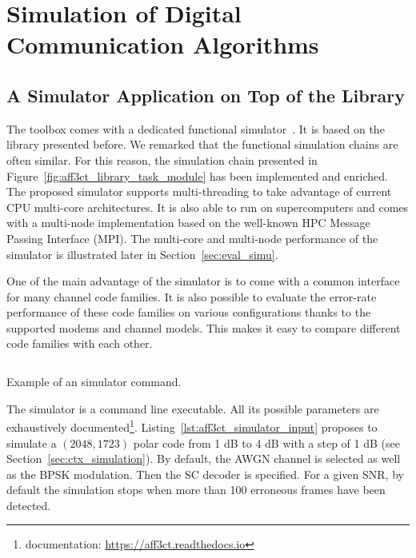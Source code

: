 \section{Simulation of Digital Communication Algorithms}

\subsection{A Simulator Application on Top of the Library}
\label{sec:aff3ct_simulator_example}

The \AFFECT toolbox comes with a dedicated functional
simulator~\cite{Cassagne2017}. It is based on the \AFFECT library presented
before. We remarked that the functional simulation chains are often similar. For
this reason, the simulation chain presented in
Figure~\ref{fig:aff3ct_library_task_module} has been implemented and enriched.
The proposed simulator supports multi-threading to take advantage of current CPU
multi-core architectures. It is also able to run on supercomputers and comes
with a multi-node implementation based on the well-known HPC Message Passing
Interface (MPI). The multi-core and multi-node performance of the \AFFECT
simulator is illustrated later in Section~\ref{sec:eval_simu}.

One of the main advantage of the \AFFECT simulator is to come with a common
interface for many channel code families. It is also possible to evaluate the
error-rate performance of these code families on various configurations thanks
to the supported modems and channel models. This makes it easy to compare
different code families with each other.

\begin{listing}[htp]
  \inputminted[frame=lines]{bash}{\curChapter/src/use_cases/simulator/input.txt}
  \caption{Example of an \AFFECT simulator command.}
  \label{lst:aff3ct_simulator_input}
\end{listing}

The \AFFECT simulator is a command line executable. All its possible parameters
are exhaustively documented\footnote{\AFFECT documentation:
\url{https://aff3ct.readthedocs.io}}. Listing~\ref{lst:aff3ct_simulator_input}
proposes to simulate a $(2048,1723)$ polar code from 1 dB to 4 dB with a step of
1 dB (see Section~\ref{sec:ctx_simulation}). By default, the AWGN channel is
selected as well as the BPSK modulation. Then the SC decoder is specified. For a
given SNR, by default the simulation stops when more than 100 erroneous frames
have been detected.

